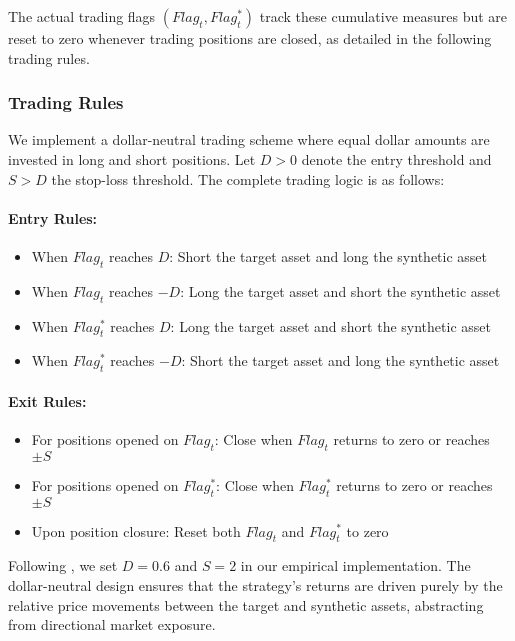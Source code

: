 The actual trading flags $(Flag_t, Flag_t^*)$ track these cumulative measures but are reset to zero whenever trading positions are closed, as detailed in the following trading rules.

\subsubsection{Trading Rules}

We implement a dollar-neutral trading scheme where equal dollar amounts are invested in long and short positions. Let $D > 0$ denote the entry threshold and $S > D$ the stop-loss threshold. The complete trading logic is as follows:

\paragraph{Entry Rules:}
\begin{itemize}
\item When $Flag_t$ reaches $D$: Short the target asset and long the synthetic asset
\item When $Flag_t$ reaches $-D$: Long the target asset and short the synthetic asset
\item When $Flag_t^*$ reaches $D$: Long the target asset and short the synthetic asset  
\item When $Flag_t^*$ reaches $-D$: Short the target asset and long the synthetic asset
\end{itemize}

\paragraph{Exit Rules:}
\begin{itemize}
\item For positions opened on $Flag_t$: Close when $Flag_t$ returns to zero or reaches $\pm S$
\item For positions opened on $Flag_t^*$: Close when $Flag_t^*$ returns to zero or reaches $\pm S$
\item Upon position closure: Reset both $Flag_t$ and $Flag_t^*$ to zero
\end{itemize}

Following \cite{xie2016}, we set $D = 0.6$ and $S = 2$ in our empirical implementation. The dollar-neutral design ensures that the strategy's returns are driven purely by the relative price movements between the target and synthetic assets, abstracting from directional market exposure.




